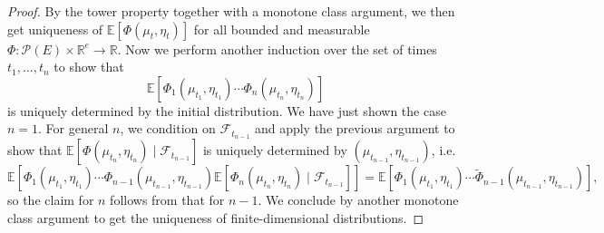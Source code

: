 \documentclass[11pt, a4paper]{article}
\begin{document}
\begin{proof}
By the tower property together with a monotone class argument, we then get
uniqueness of $\mathbb{E} [\Phi (\mu_t, \eta_t)]$ for all bounded and
measurable $\Phi : \mathcal{P} (E) \times \mathbb{R}^e \rightarrow
\mathbb{R}$. Now we perform another induction over the set of times $t_1,
\ldots, t_n$ to show that
\[ \mathbb{E} [\Phi_1 (\mu_{t_1}, \eta_{t_1}) \cdots \Phi_n (\mu_{t_n},
   \eta_{t_n})] \]
is uniquely determined by the initial distribution. We have just shown the
case $n = 1$. For general $n$, we condition on $\mathcal{F}_{t_{n - 1}}$ and
apply the previous argument to show that $\mathbb{E} [\Phi (\mu_{t_n},
\eta_{t_n}) \mid\mathcal{F}_{t_{n - 1}}]$ is uniquely determined by $ (\mu_{t_{n
- 1}}, \eta_{t_{n - 1}})$, i.e.
\[ \mathbb{E} [\Phi_1 (\mu_{t_1}, \eta_{t_1}) \cdots \Phi_{n - 1} (\mu_{t_{n -
   1}}, \eta_{t_{n - 1}}) \mathbb{E} [\Phi_n (\mu_{t_n}, \eta_{t_n})
   \mid\mathcal{F}_{t_{n - 1}}]] =\mathbb{E} [\Phi_1 (\mu_{t_1}, \eta_{t_1})
   \cdots \tilde{\Phi}_{n - 1} (\mu_{t_{n - 1}}, \eta_{t_{n - 1}})], \]
so the claim for $n$ follows from that for $n-1$. We conclude by another monotone class argument
to get the uniqueness of finite-dimensional distributions.
\end{proof}
\end{document}
